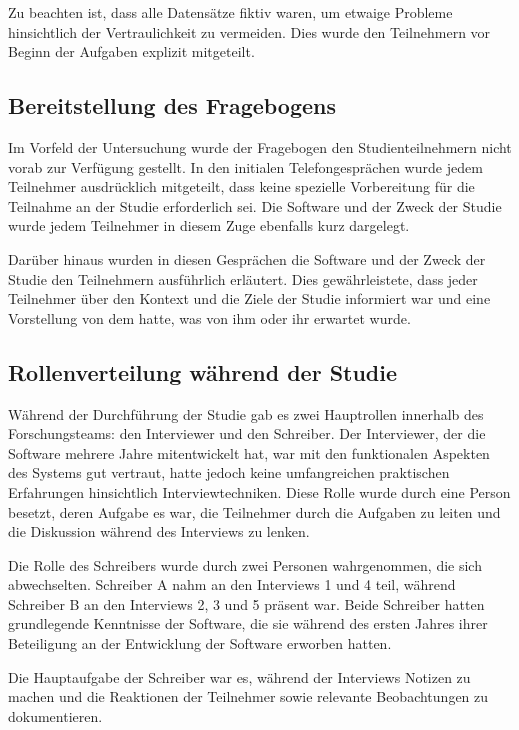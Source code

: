 Zu beachten ist, dass alle Datensätze fiktiv waren, um etwaige Probleme hinsichtlich der Vertraulichkeit zu vermeiden. Dies wurde den Teilnehmern vor Beginn der Aufgaben explizit mitgeteilt.

\subsection{Bereitstellung des Fragebogens}

Im Vorfeld der Untersuchung wurde der Fragebogen den Studienteilnehmern nicht vorab zur Verfügung gestellt. In den initialen Telefongesprächen wurde jedem Teilnehmer ausdrücklich mitgeteilt, dass keine spezielle Vorbereitung für die Teilnahme an der Studie erforderlich sei. Die Software und der Zweck der Studie wurde jedem Teilnehmer in diesem Zuge ebenfalls kurz dargelegt.

Darüber hinaus wurden in diesen Gesprächen die Software und der Zweck der Studie den Teilnehmern ausführlich erläutert. Dies gewährleistete, dass jeder Teilnehmer über den Kontext und die Ziele der Studie informiert war und eine Vorstellung von dem hatte, was von ihm oder ihr erwartet wurde.

\subsection{Rollenverteilung während der Studie}

Während der Durchführung der Studie gab es zwei Hauptrollen innerhalb des Forschungsteams: den Interviewer und den Schreiber. Der Interviewer, der die Software mehrere Jahre mitentwickelt hat, war mit den funktionalen Aspekten des Systems gut vertraut, hatte jedoch keine umfangreichen praktischen Erfahrungen hinsichtlich Interviewtechniken. Diese Rolle wurde durch eine Person besetzt, deren Aufgabe es war, die Teilnehmer durch die Aufgaben zu leiten und die Diskussion während des Interviews zu lenken.

Die Rolle des Schreibers wurde durch zwei Personen wahrgenommen, die sich abwechselten. Schreiber A nahm an den Interviews 1 und 4 teil, während Schreiber B an den Interviews 2, 3 und 5 präsent war. Beide Schreiber hatten grundlegende Kenntnisse der Software, die sie während des ersten Jahres ihrer Beteiligung an der Entwicklung der Software erworben hatten.

Die Hauptaufgabe der Schreiber war es, während der Interviews Notizen zu machen und die Reaktionen der Teilnehmer sowie relevante Beobachtungen zu dokumentieren. 

